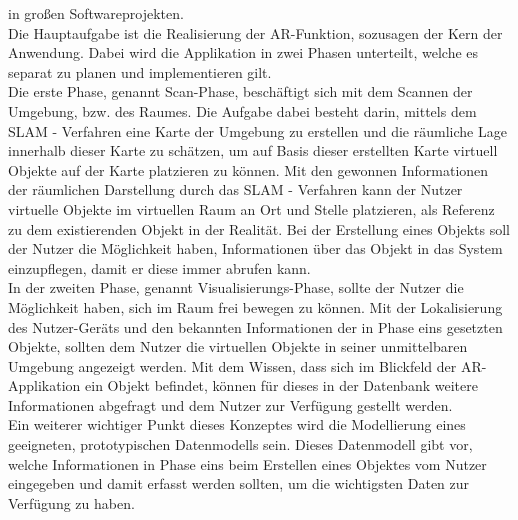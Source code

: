 in großen Softwareprojekten.
\\
\linebreak
Die Hauptaufgabe ist die Realisierung der \acl{AR}-Funktion, sozusagen der Kern der Anwendung. Dabei wird die Applikation in zwei 
Phasen unterteilt, welche es separat zu planen und implementieren gilt.
\\ 
\linebreak
Die erste Phase, genannt Scan-Phase, beschäftigt sich mit dem Scannen der Umgebung, bzw. des Raumes. Die Aufgabe dabei besteht darin, 
mittels dem \ac{SLAM} - Verfahren eine Karte der Umgebung zu erstellen und die räumliche Lage innerhalb dieser Karte zu schätzen, um 
auf Basis dieser erstellten Karte virtuell Objekte auf der Karte platzieren zu können. Mit den gewonnen Informationen der räumlichen 
Darstellung durch das \acs{SLAM} - Verfahren kann der Nutzer virtuelle Objekte im virtuellen Raum an Ort und Stelle platzieren, als 
Referenz zu dem existierenden Objekt in der Realität. %
Bei der Erstellung eines Objekts soll der Nutzer die 
Möglichkeit haben, Informationen über das Objekt in das System einzupflegen, damit er diese immer abrufen kann. 
\\ 
\linebreak
In der zweiten Phase, genannt Visualisierungs-Phase, sollte der Nutzer die Möglichkeit haben, sich im Raum frei bewegen zu können. 
Mit der Lokalisierung des Nutzer-Geräts und den bekannten Informationen der in Phase eins gesetzten Objekte, sollten dem Nutzer 
die virtuellen Objekte in seiner unmittelbaren Umgebung angezeigt werden. Mit dem Wissen, dass sich im Blickfeld der \acs{AR}-Applikation 
ein Objekt befindet, können für dieses in der Datenbank weitere Informationen abgefragt und dem Nutzer zur Verfügung gestellt werden.
\\ 
\linebreak
Ein weiterer wichtiger Punkt dieses Konzeptes wird die Modellierung eines geeigneten, %
prototypischen Datenmodells sein. 
Dieses Datenmodell gibt vor, welche Informationen in Phase eins beim Erstellen eines Objektes vom Nutzer eingegeben und damit erfasst 
werden sollten, um die wichtigsten Daten zur Verfügung zu haben. 

